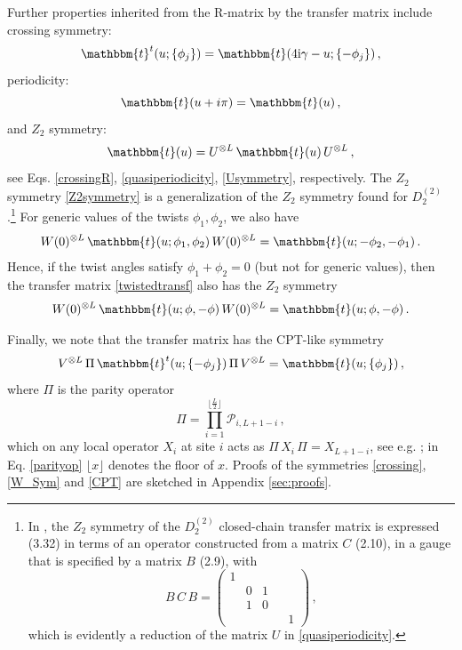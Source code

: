 \documentclass[12pt]{article}
\numberwithin{equation}{section}
\newcommand{\ri}{{\rm i}}
\begin{document}
	Further properties inherited from the R-matrix
	by the transfer matrix include crossing symmetry:
	\begin{equation}
		\mathbbm{t}^t(u; \{\phi_j\}) = \mathbbm{t}(4\ri \gamma-u; \{-\phi_j\}) \,,
		\label{crossing}
	\end{equation}
	periodicity:
	\begin{equation}
		\mathbbm{t}(u+i\pi) = \mathbbm{t}(u) \,,
		\label{periodicity}
	\end{equation}
	and $Z_2$ symmetry:
	\begin{equation}
		\mathbbm{t}(u) = U^{\otimes L}\, \mathbbm{t}(u)\, U^{\otimes L} \,,
		\label{Z2symmetry}
	\end{equation}
	see Eqs. \eqref{crossingR}, \eqref{quasiperiodicity}, \eqref{Usymmetry},   
	respectively. The $Z_2$ symmetry \eqref{Z2symmetry} is a 
	generalization of the $Z_2$ symmetry found for $D^{(2)}_2$ \cite{IkJS08,RPJS20, NeRe21a}.\footnote{In \cite{NeRe21a}, the $Z_2$ symmetry of the $D^{(2)}_2$ closed-chain transfer matrix is expressed (3.32) in terms of an operator constructed from a matrix $C$ (2.10), in a gauge that is specified by a matrix $B$ (2.9), with
		\begin{equation*}
			B\, C\, B = \left(\begin{smallmatrix}
				1 & & & \\
				& 0 & 1 & \\
				& 1 & 0 & \\
				& & & & 1 
			\end{smallmatrix}\right) \,,
		\end{equation*}
		which is evidently a reduction of the matrix $U$ in \eqref{quasiperiodicity}.} For generic values of the twists $\phi_1, \phi_2$, we also have 
	\begin{align}
		W(0)^{\otimes L}\, \mathbbm{t}(u; \phi_1, \phi_2)\, W(0)^{\otimes L}=\mathbbm{t}(u; -\phi_2, -\phi_1) \,.
		\label{W_Sym}
	\end{align}
	Hence, if the twist angles satisfy $\phi_1 + \phi_2 =0$ (but not for generic values), then the transfer matrix \eqref{twistedtransf} also has the $Z_2$ symmetry 
	\begin{align}
		W(0)^{\otimes L}\, \mathbbm{t}(u; \phi, -\phi)\, W(0)^{\otimes L}=\mathbbm{t}(u; \phi, -\phi) \,.
		\label{W_Sym2}
	\end{align}
	
	
	Finally, we note that the transfer matrix has the CPT-like symmetry
	\begin{equation}
		V^{\otimes L}\,   \Pi\, \mathbbm{t}^t(u; \{-\phi_j\})\, \Pi\, V^{\otimes L} = \mathbbm{t}(u; \{\phi_j\}) \,,
		\label{CPT}
	\end{equation}
	where $\Pi$ is the parity operator
	\begin{equation}
		\Pi = \prod_{i=1}^{\lfloor\frac{L}{2}\rfloor} \mathcal{P}_{i,L+1-i} \,,
		\label{parityop}
	\end{equation}
	which on any local operator $X_i$ at site $i$ acts as $\Pi\, X_i\, \Pi = X_{L+1-i}$, see e.g. \cite{DoNe98}; in Eq. \eqref{parityop} $\lfloor x \rfloor$ denotes the floor of $x$.
	Proofs of the symmetries \eqref{crossing}, \eqref{W_Sym} and \eqref{CPT} are sketched in Appendix \ref{sec:proofs}.
	
\end{document}
